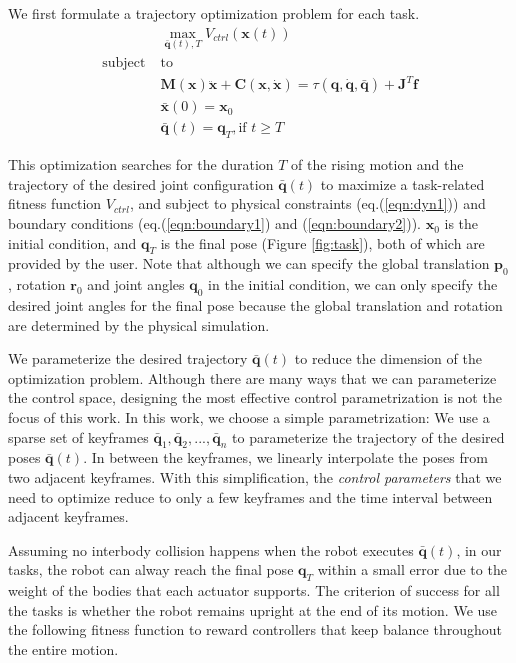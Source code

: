 We first formulate a trajectory optimization problem for each task.
\begin{align}
 \label{eqn:obj}&\max_{\bar{\mathbf{q}}(t),T} V_{ctrl}(\mathbf{x}(t))\\
\nonumber  \mathrm{subject\;} &\mathrm{to} \\
\label{eqn:dyn1} & \mathbf{M}(\mathbf{x})\mathbf{\ddot{x}}+\mathbf{C}(\mathbf{x},\mathbf{\dot{x}}) =\tau(\mathbf{q}, \dot{\mathbf{q}}, \bar{\mathbf{q}}) + \mathbf{J}^T\mathbf{f}\\
\label{eqn:boundary1}&\bar{\mathbf{x}}(0) = \mathbf{x}_0\\
\label{eqn:boundary2}&\bar{\mathbf{q}}(t) = \mathbf{q}_T, \text{if } t \geq T
\end{align}

This optimization searches for the duration $T$ of the rising motion and the trajectory of the desired joint configuration $\bar{\mathbf{q}}(t)$ to maximize a task-related fitness function $V_{ctrl}$, and subject to physical constraints (eq.(\ref{eqn:dyn1})) and boundary conditions (eq.(\ref{eqn:boundary1}) and (\ref{eqn:boundary2})). $\mathbf{x}_0$ is the initial condition, and $\mathbf{q}_T$ is the final pose (Figure \ref{fig:task}), both of which are provided by the user. Note that although we can specify the global translation $\mathbf{p}_0$, rotation $\mathbf{r}_0$ and joint angles $\mathbf{q}_0$ in the initial condition, we can only specify the desired joint angles for the final pose because the global translation and rotation are determined by the physical simulation.

We parameterize the desired trajectory $\bar{\mathbf{q}}(t)$ to reduce the dimension of the optimization problem. Although there are many ways that we can parameterize the control space, designing the most effective control parametrization is not the focus of this work. In this work, we choose a simple parametrization: We use a sparse set of keyframes $\bar{\mathbf{q}}_1, \bar{\mathbf{q}}_2, ..., \bar{\mathbf{q}}_n$ to parameterize the trajectory of the desired poses $\bar{\mathbf{q}}(t)$. In between the keyframes, we linearly interpolate the poses from two adjacent keyframes. With this simplification, the \emph{control parameters} that we need to optimize reduce to only a few keyframes and the time interval between adjacent keyframes. 

Assuming no interbody collision happens when the robot executes $\bar{\mathbf{q}}(t)$, in our tasks, the robot can alway reach the final pose $\mathbf{q}_T$ within a small error due to the weight of the bodies that each actuator supports. The criterion of success for all the tasks is whether the robot remains upright at the end of its motion. We use the following fitness function to reward controllers that keep balance throughout the entire motion.

